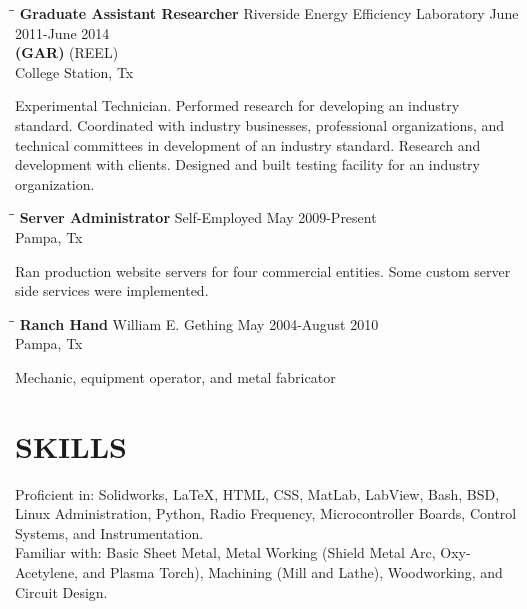 \documentclass{res}
\begin{document}
\begin{resume}
   \begin{tabbing}
   \hspace{2.5in}\= \hspace{2.6in}\= \kill %
    {\bf Graduate Assistant Researcher} \>Riverside Energy Efficiency Laboratory     \>June 2011-June 2014\\
    {\bf (GAR)}                    \>(REEL)\\	\>College Station, Tx
   \end{tabbing}\vspace{-20pt}      %
   	Experimental Technician. Performed research for developing an industry standard. Coordinated with industry businesses, professional organizations, and technical committees in development of an industry standard. Research and development with clients. Designed and built testing facility for an industry organization.
   \begin{tabbing}
   \hspace{2.5in}\= \hspace{2.6in}\= \kill %
    {\bf Server Administrator} \>Self-Employed \> May 2009-Present\\
                          \>Pampa, Tx
   \end{tabbing}\vspace{-20pt}
   	Ran production website servers for four commercial entities. Some custom server side services were implemented.
   \begin{tabbing}
   \hspace{2.5in}\= \hspace{2.6in}\= \kill %
    {\bf Ranch Hand} \>William E. Gething \> May 2004-August 2010 \\
                          \>Pampa, Tx
   \end{tabbing}\vspace{-20pt}
   Mechanic, equipment operator, and metal fabricator

\section{SKILLS}          
	Proficient in: Solidworks, \LaTeX{}, HTML, CSS, MatLab, LabView, Bash, BSD, Linux Administration, Python, Radio Frequency, Microcontroller Boards, Control Systems, and Instrumentation.\\
    Familiar with: Basic Sheet Metal, Metal Working (Shield Metal Arc, Oxy-Acetylene, and Plasma Torch), Machining (Mill and Lathe), Woodworking, and Circuit Design.


\end{resume}
\end{document}
